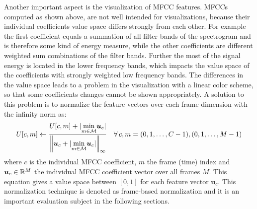 Another important aspect is the visualization of MFCC features.
MFCCs computed as shown above, are not well intended for visualizations, because their individual coefficients value space differs strongly from each other.
For example the first coefficient equals a summation of all filter bands of the spectrogram and is therefore some kind of energy measure, while the other coefficients are different weighted sum combinations of the filter bands.
Further the most of the signal energy is located in the lower frequency bands, which impacts the value space of the coefficients with strongly weighted low frequency bands.
The differences in the value space leads to a problem in the visualization with a linear color scheme, so that some coefficients changes cannot be shown appropriately.
A solution to this problem is to normalize the feature vectors over each frame dimension with the infinity norm as:
\begin{equation}\label{eq:signal_mfcc_norm}
  U[c, m] \gets \frac{U[c, m] + \vert \underset{m \in \mathcal{M}}{\min} \bm{u}_c \vert}{\norm{\bm{u}_c + \vert \underset{m \in \mathcal{M}}{\min} \bm{u}_c \vert}_\infty} \quad \forall \, c, m = (0, 1, \dots, C - 1), (0, 1, \dots, M - 1)
\end{equation}
where $c$ is the individual MFCC coefficient, $m$ the frame (time) index and $\bm{u}_c \in \mathbb{R}^M$ the individual MFCC coefficient vector over all frames $M$.
This equation gives a value space between $[0, 1]$ for each feature vector $\bm{u}_c$.
This normalization technique is denoted as frame-based normalization and it is an important evaluation subject in the following sections.


